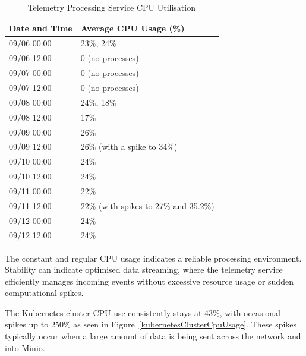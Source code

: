 \documentclass[journal]{IEEEtran}
\begin{document}
\begin{table}[h!]
  \centering
  \begin{tabular}{|l|l|}
  \hline
  \textbf{Date and Time} & \textbf{Average CPU Usage (\%)}        \\ \hline
  09/06 00:00           & 23\%, 24\%                             \\ \hline
  09/06 12:00           & 0 (no processes)                       \\ \hline
  09/07 00:00           & 0 (no processes)                       \\ \hline
  09/07 12:00           & 0 (no processes)                       \\ \hline
  09/08 00:00           & 24\%, 18\%                             \\ \hline
  09/08 12:00           & 17\%                                   \\ \hline
  09/09 00:00           & 26\%                                   \\ \hline
  09/09 12:00           & 26\% (with a spike to 34\%)            \\ \hline
  09/10 00:00           & 24\%                                   \\ \hline
  09/10 12:00           & 24\%                                   \\ \hline
  09/11 00:00           & 22\%                                   \\ \hline
  09/11 12:00           & 22\% (with spikes to 27\% and 35.2\%)  \\ \hline
  09/12 00:00           & 24\%                                   \\ \hline
  09/12 12:00           & 24\%                                   \\ \hline
  \end{tabular}
  \caption{Telemetry Processing Service CPU Utilisation}
  \label{table:telemetry-cpu-usage}
\end{table}

The constant and regular CPU usage indicates a reliable processing environment. Stability can indicate optimised data streaming, where the telemetry service efficiently manages incoming events without excessive resource usage or sudden computational spikes. 

The Kubernetes cluster CPU use consistently stays at 43\%, with occasional spikes up to 250\% as seen in Figure~\ref{kubernetesClusterCpuUsage}. These spikes typically occur when a large amount of data is being sent across the network and into Minio.
\end{document}
